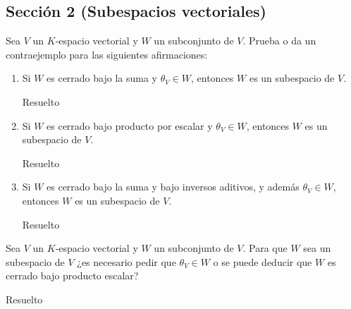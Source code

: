 \subsection{Sección 2 (Subespacios vectoriales)}

\begin{exercise}{}{}
    Sea $V$ un $K$-espacio vectorial y $W$ un subconjunto de $V$. Prueba o da un contraejemplo para las siguientes afirmaciones:
    \begin{enumerate}
        \item Si $W$ es cerrado bajo la suma y $\theta_V \in W$, entonces $W$ es un subespacio de $V$.
\begin{solution}{}{}
Resuelto
\end{solution}
        \item Si $W$ es cerrado bajo producto por escalar y $\theta_V \in W$, entonces $W$ es un subespacio de $V$.
\begin{solution}{}{}
Resuelto
\end{solution}
        \item Si $W$ es cerrado bajo la suma y bajo inversos aditivos, y además $\theta_V \in W$, entonces $W$ es un subespacio de $V$.        
\begin{solution}{}{}
Resuelto
\end{solution}
\end{enumerate}
\end{exercise}




\begin{exercise}{}{}
Sea $V$ un $K$-espacio vectorial y $W$ un subconjunto de $V$. Para que $W$ sea un subespacio de  $V$ ¿es necesario  pedir que $\theta_V \in W$ o se puede deducir que $W$ es cerrado bajo producto escalar?

\begin{solution}{}{}
Resuelto
\end{solution}

\end{exercise}






